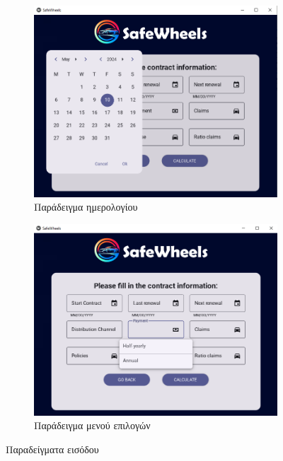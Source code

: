 \documentclass{llncs}
\begin{document}
\begin{figure}
    \centering
    \begin{subfigure}{0.45\linewidth}
        \includegraphics[width=\linewidth]{images/contract_date.png}
        \caption{Παράδειγμα ημερολογίου}
        \label{fig:con_date}
    \end{subfigure}
    \begin{subfigure}{0.45\linewidth}
        \includegraphics[width=\linewidth]{images/contract_pay.png}
        \caption{Παράδειγμα μενού επιλογών}
        \label{fig:pay}
    \end{subfigure}
    \caption{Παραδείγματα εισόδου}
    \label{fig:contract_examples}
\end{figure}
\end{document}
